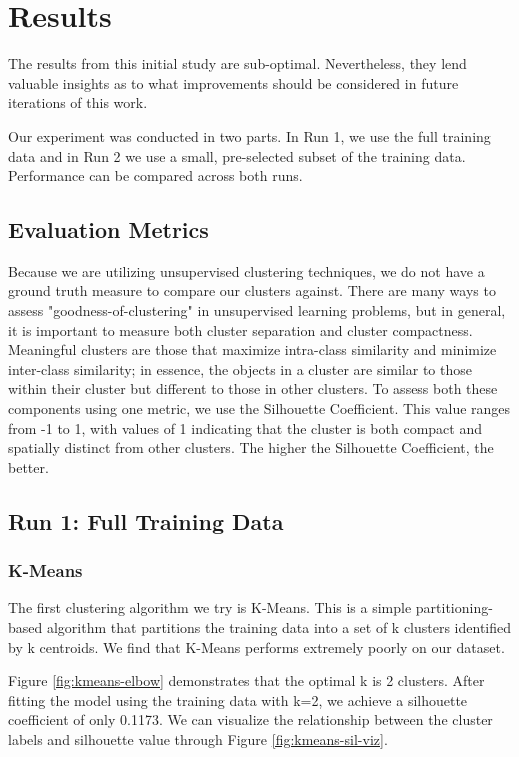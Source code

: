 \documentclass[conference]{IEEEtran}
\begin{document}
\section{Results}
The results from this initial study are sub-optimal. Nevertheless, they lend valuable insights as to what improvements should be considered in future iterations of this work. 

Our experiment was conducted in two parts. In Run 1, we use the full training data and in Run 2 we use a small, pre-selected subset of the training data. Performance can be compared across both runs.  

\subsection{Evaluation Metrics}
Because we are utilizing unsupervised clustering techniques, we do not have a ground truth measure to compare our clusters against. There are many ways to assess "goodness-of-clustering" in unsupervised learning problems, but in general, it is important to measure both cluster separation and cluster compactness. Meaningful clusters are those that maximize intra-class similarity and minimize inter-class similarity; in essence, the objects in a cluster are similar to those within their cluster but different to those in other clusters. To assess both these components using one metric, we use the Silhouette Coefficient. This value ranges from -1 to 1, with values of 1 indicating that the cluster is both compact and spatially distinct from other clusters. The higher the Silhouette Coefficient, the better.

\subsection{Run 1: Full Training Data}
\subsubsection{K-Means}
The first clustering algorithm we try is K-Means. This is a simple partitioning-based algorithm that partitions the training data into a set of k clusters identified by k centroids. We find that K-Means performs extremely poorly on our dataset. 

Figure \ref{fig:kmeans-elbow} demonstrates that the optimal k is 2 clusters. After fitting the model using the training data with k=2, we achieve a silhouette coefficient of only 0.1173. We can visualize the relationship between the cluster labels and silhouette value through Figure \ref{fig:kmeans-sil-viz}. 
\end{document}
